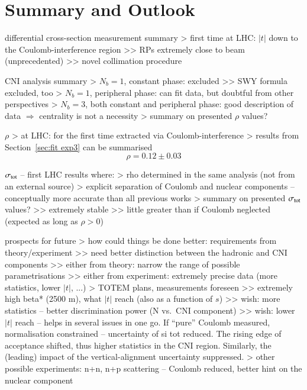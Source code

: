 \section{Summary and Outlook}

\> differential cross-section measurement summary
\>> first time at LHC: $|t|$ down to the Coulomb-interference region
\>>> RPs extremely close to beam (unprecedented)
\>>> novel collimation procedure


\> CNI analysis summary
\>> $N_b=1$, constant phase: excluded
\>>> SWY formula excluded, too
\>> $N_b=1$, peripheral phase: can fit data, but doubtful from other perspectives
\>> $N_b=3$, both constant and peripheral phase: good description of data $\Rightarrow$ centrality is not a necessity
\>> summary on presented $\rho$ values?

\> $\rho$
\>> at LHC: for the first time extracted via Coulomb-interference
\>> results from Section~\ref{sec:fit exp3} can be summarised
\begin{equation}
\label{eq:rho final}
\rho = 0.12 \pm 0.03
\end{equation}

\> $\sigma_{\rm tot}$ -- first LHC results where:
\>> rho determined in the same analysis (not from an external source)
\>> explicit separation of Coulomb and nuclear components -- conceptually more accurate than all previous works
\>> summary on presented $\sigma_{\rm tot}$ values?
\>>> extremely stable
\>>> little greater than if Coulomb neglected (expected as long as $\rho > 0$)

\> prospects for future
\>> how could things be done better: requirements from theory/experiment
\>>> need better distinction between the hadronic and CNI components
\>>> either from theory: narrow the range of possible parametrisations
\>>> either from experiment: extremely precise data (more statistics, lower $|t|$, ...)
\>> TOTEM plans, measurements foreseen
\>>> extremely high beta* (2500 m), what $|t|$ reach (also as a function of $s$)
\>>> wish: more statistics -- better discrimination power (N vs.~CNI component)
\>>> wish: lower $|t|$ reach -- helps in several issues in one go. If ``pure'' Coulomb measured, normalisation constrained -- uncertainty of si tot reduced. The rising edge of acceptance shifted, thus higher statistics in the CNI region. Similarly, the (leading) impact of the vertical-alignment uncertainty suppressed.
\>> other possible experiments: n+n, n+p scattering -- Coulomb reduced, better hint on the nuclear component
